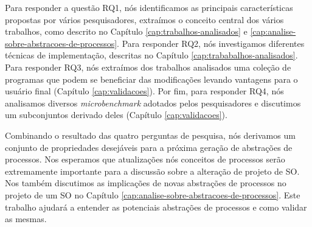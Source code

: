 Para responder a questão RQ1, nós identificamos as principais características
propostas por vários pesquisadores, extraímos o conceito central dos vários
trabalhos, como descrito no Capítulo \ref{cap:trabalhos-analisados} e
\ref{cap:analise-sobre-abstracoes-de-processos}. Para responder RQ2, nós
investigamos diferentes técnicas de implementação, descritas no Capítulo
\ref{cap:trababalhos-analisados}. Para responder RQ3, nós extraímos dos
trabalhos analisados uma coleção de programas que podem se beneficiar das
modificações levando vantagens para o usuário final (Capítulo
\ref{cap:validacoes}). Por fim, para responder RQ4, nós analisamos diversos
\emph{microbenchmark} adotados pelos pesquisadores e discutimos um subconjuntos
derivado deles (Capítulo \ref{cap:validacoes}).

Combinando o resultado das quatro perguntas de pesquisa, nós derivamos um
conjunto de propriedades desejáveis para a próxima geração de abstrações de
processos. Nos esperamos que atualizações nós conceitos de processos serão
extremamente importante para a discussão sobre a alteração de projeto de SO.
Nos também discutimos as implicações de novas abstrações de processos no
projeto de um SO no Capítulo \ref{cap:analise-sobre-abstracoes-de-processos}.
Este trabalho ajudará a entender as potenciais abstrações de processos e como
validar as mesmas.
